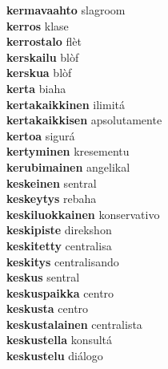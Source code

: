 \textbf{kermavaahto } slagroom \\
\textbf{kerros } klase \\
\textbf{kerrostalo } flèt \\
\textbf{kerskailu } blòf \\
\textbf{kerskua } blòf \\
\textbf{kerta } biaha \\
\textbf{kertakaikkinen } ilimitá \\
\textbf{kertakaikkisen } apsolutamente \\
\textbf{kertoa } sigurá \\
\textbf{kertyminen } kresementu \\
\textbf{kerubimainen } angelikal \\
\textbf{keskeinen } sentral \\
\textbf{keskeytys } rebaha \\
\textbf{keskiluokkainen } konservativo \\
\textbf{keskipiste } direkshon \\
\textbf{keskitetty } centralisa \\
\textbf{keskitys } centralisando \\
\textbf{keskus } sentral \\
\textbf{keskuspaikka } centro \\
\textbf{keskusta } centro \\
\textbf{keskustalainen } centralista \\
\textbf{keskustella } konsultá \\
\textbf{keskustelu } diálogo \\
